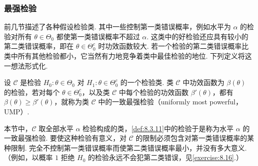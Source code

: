 \subsubsection{最强检验}\label{sec:8.3.2}
前几节描述了各种假设检验类. 其中一些控制第一类错误概率，例如水平为 $\alpha$ 的检验对所有 $\theta\in\Theta_0$ 都使第一类错误概率不超过 $\alpha$. 这类中的好检验还应具有较小的第二类错误概率，即在 $\theta\in\Theta_0^c$ 时功效函数较大. 若一个检验的第二类错误概率比类中所有其他检验都小，它当然有力地竞争着类中最佳检验的地位. 下列定义将这一想法形式化.
\begin{definition}\label{def:8.3.11}
设 $\mathscr C$ 是检验 $H_0:\theta\in\Theta_0$ 对 $H_1:\theta\in\Theta_0^c$ 的一个检验类. 类 $\mathscr C$ 中功效函数为 $\beta(\theta)$ 的检验，若对每个 $\theta\in\Theta_0^c$，以及类 $\mathscr C$ 中每个检验的功效函数 $\beta'(\theta)$，都有 $\beta(\theta)\ge\beta'(\theta)$，就称为类 $\mathscr C$ 中的一致最强检验（uniformly most powerful，UMP\mbox{）.}
\end{definition}
本节中，$\mathscr C$ 取全部水平 $\alpha$ 检验构成的类，\autoref{def:8.3.11}中的检验于是称为水平 $\alpha$ 的一致最强检验. 要使这种检验有意义，对 $\mathscr C$ 的限制必须包含对第一类错误概率的某种限制. 完全不控制第一类错误概率而使第二类错误概率最小，并没有多大意义. （例如，以概率 $1$ 拒绝 $H_0$ 的检验永远不会犯第二类错误，见\autoref{exercise:8.16}.）

